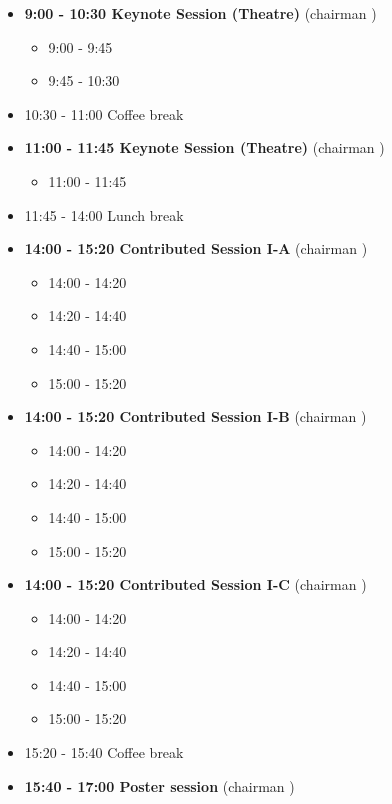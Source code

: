 \documentclass[10pt, A4]{article}%
\begin{document}
\begin{itemize}    
  \item {\bf 9:00 - 10:30 Keynote Session (Theatre)} (chairman ) 
  \begin{itemize}
    \item 9:00 - 9:45
    \item 9:45 - 10:30 
  \end{itemize}
  \item 10:30 - 11:00 Coffee break
  \item {\bf 11:00 - 11:45 Keynote Session (Theatre)} (chairman ) 
  \begin{itemize}
    \item 11:00 - 11:45
  \end{itemize}
  \item 11:45 - 14:00 Lunch break      
  \item {\bf 14:00 - 15:20 Contributed Session I-A} (chairman ) 
  \begin{itemize}
    \item 14:00 - 14:20 
    \item 14:20 - 14:40 
    \item 14:40 - 15:00 
    \item 15:00 - 15:20 
  \end{itemize}
  \item {\bf 14:00 - 15:20 Contributed Session I-B} (chairman ) 
  \begin{itemize}
    \item 14:00 - 14:20 
    \item 14:20 - 14:40 
    \item 14:40 - 15:00 
    \item 15:00 - 15:20 
  \end{itemize}
    \item {\bf 14:00 - 15:20 Contributed Session I-C} (chairman ) 
  \begin{itemize}
    \item 14:00 - 14:20 
    \item 14:20 - 14:40 
    \item 14:40 - 15:00 
    \item 15:00 - 15:20 
  \end{itemize}
  \item 15:20 - 15:40 Coffee break
  \item {\bf 15:40 - 17:00 Poster session} (chairman )
\end{itemize}

\newpage
\end{document}
